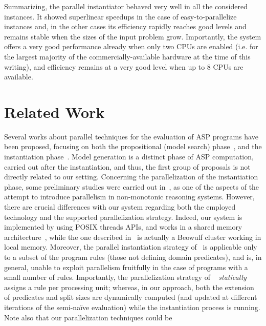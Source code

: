 \documentclass[preprint]{tlp}
\begin{document}
Summarizing, the parallel instantiator behaved very well in all the considered
instances. It showed superlinear speedups in the case of easy-to-parallelize instances
and, in the other cases its efficiency rapidly reaches good levels and remains stable
when the sizes of the input problem grow. Importantly, the system offers a very good
performance already when only two CPUs are enabled (i.e. for the largest majority of the
commercially-available hardware at the time of this writing), and efficiency remains
at a very good level when up to 8 CPUs are available.

\section{Related Work}\label{sec:related}

Several works about parallel techniques for the evaluation of ASP
programs have been proposed, focusing on both
the propositional (model search) phase~\cite{fink-etal-2001,ellg-etal-2009,gres-etal-2005,pont-elkh-2001},
and  the instantiation
phase~\cite{bald-etal-2005-parallel,cali-etal-2008-joacil}. Model
generation is a distinct phase of  ASP computation, carried out
after the instantiation, and thus, the first group of proposals is
not directly related to our setting.
Concerning the parallelization of the instantiation phase, some preliminary
studies were carried out in~\cite{bald-etal-2005-parallel}, as one of the
aspects of the attempt to introduce parallelism in non-monotonic
reasoning systems. However, there are crucial differences with our
system regarding both the employed technology and the supported
parallelization strategy. Indeed, our system  is implemented by
using POSIX threads APIs, and works in a shared memory
architecture~\cite{stall-98}, while the one described
in~\cite{bald-etal-2005-parallel} is actually a
Beowulf cluster working in local memory. Moreover,
the parallel instantiation strategy
of~\cite{bald-etal-2005-parallel} is applicable only to a subset of
the program rules (those not defining domain predicates), and is, in
general, unable to exploit parallelism fruitfully in the case of
programs with a small number of rules. Importantly, the
parallelization strategy of ~\cite{bald-etal-2005-parallel} {\em
statically} assigns a rule per processing unit; whereas, in our
approach, both the extension of predicates and split sizes are
dynamically computed (and updated at different iterations of the
semi-na\"ive evaluation) while the instantiation process is running. Note also
that our parallelization techniques could be
\end{document}
